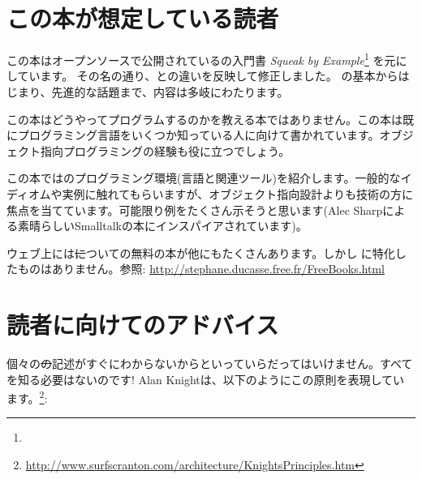 \documentclass[a4paper,10pt,twoside]{book}
\begin{document}

\section*{この本が想定している読者}

この本はオープンソースで公開されている\squeak の入門書 \emph{Squeak by Example}\footnote{\sbe} を元にしています。
その名の通り、\pharo と\squeak の違いを反映して修正しました。
\pharo の基本からはじまり、先進的な話題まで、内容は多岐にわたります。

この本はどうやってプログラムするのかを教える本ではありません。この本は既にプログラミング言語をいくつか知っている人に向けて書かれています。オブジェクト指向プログラミングの経験も役に立つでしょう。

この本では\pharo のプログラミング環境(言語と関連ツール)を紹介します。一般的なイディオムや実例に触れてもらいますが、オブジェクト指向設計よりも技術の方に焦点を当てています。可能限り例をたくさん示そうと思います(Alec Sharpによる素晴らしいSmalltalkの本\cite{Shar97a}にインスパイアされています)。

ウェブ上には\st についての無料の本が他にもたくさんあります。しかし \pharo に特化したものはありません。参照:
\url{http://stephane.ducasse.free.fr/FreeBooks.html}

\ifluluelse{}{\newpage} %
\section*{読者に向けてのアドバイス}


個々の\st の記述がすぐにわからないからといっていらだってはいけません。すべてを知る必要はないのです!
Alan Knightは、以下のようにこの原則を表現しています。\footnote{\url{http://www.surfscranton.com/architecture/KnightsPrinciples.htm}}:

\end{document}
